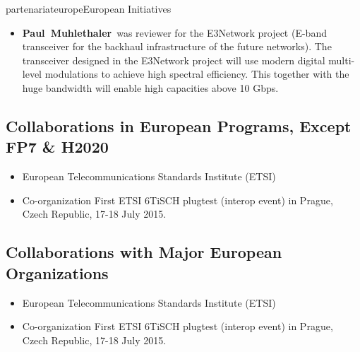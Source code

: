 \documentclass{ra2016}
\newcommand{\paul}             {\textbf{Paul~Muhlethaler}}
\begin{document}
\begin{module}{partenariat}{europe}{European Initiatives}
\begin{itemize}
    \item \paul~was reviewer for the E3Network project  (E-band transceiver for the backhaul infrastructure of the future networks). The transceiver designed in the E3Network project will use modern digital multi-level modulations to achieve high spectral efficiency. This together with the huge bandwidth will enable high capacities above 10 Gbps.
\end{itemize}




\subsection{Collaborations in European Programs, Except FP7 \& H2020}
\begin{itemize}
    \item European Telecommunications Standards Institute (ETSI)
    \item Co-organization First ETSI 6TiSCH plugtest (interop event) in Prague, Czech Republic, 17-18 July 2015.
\end{itemize}


\subsection{Collaborations with Major European Organizations}
\begin{itemize}
    \item European Telecommunications Standards Institute (ETSI)
    \item Co-organization First ETSI 6TiSCH plugtest (interop event) in Prague, Czech Republic, 17-18 July 2015.
\end{itemize}


\end{module}
\end{document}
